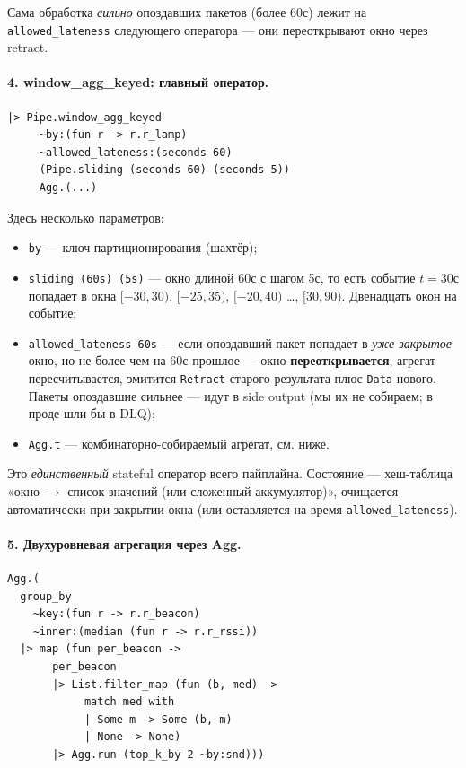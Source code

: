Сама обработка \emph{сильно} опоздавших пакетов (более 60с) лежит на
\texttt{allowed\_lateness} следующего оператора --- они переоткрывают
окно через retract.

\paragraph{4. window\_agg\_keyed: главный оператор.}
\begin{lstlisting}
|> Pipe.window_agg_keyed
     ~by:(fun r -> r.r_lamp)
     ~allowed_lateness:(seconds 60)
     (Pipe.sliding (seconds 60) (seconds 5))
     Agg.(...)
\end{lstlisting}

Здесь несколько параметров:

\begin{itemize}
\item \texttt{by} --- ключ партиционирования (шахтёр);
\item \texttt{sliding (60s) (5s)} --- окно длиной 60с с шагом 5с,
то есть событие $t=30$с попадает в окна $[-30, 30)$, $[-25, 35)$,
$[-20, 40)$ \ldots, $[30, 90)$. Двенадцать окон на событие;
\item \texttt{allowed\_lateness 60s} --- если опоздавший пакет
попадает в \emph{уже закрытое} окно, но не более чем на 60с
прошлое --- окно \textbf{переоткрывается}, агрегат пересчитывается,
эмитится \texttt{Retract} старого результата плюс \texttt{Data}
нового. Пакеты опоздавшие сильнее --- идут в side output (мы их не
собираем; в проде шли бы в DLQ);
\item \texttt{Agg.t} --- комбинаторно-собираемый агрегат, см. ниже.
\end{itemize}

Это \emph{единственный} stateful оператор всего пайплайна. Состояние
--- хеш-таблица «окно $\to$ список значений (или сложенный
аккумулятор)», очищается автоматически при закрытии окна (или
оставляется на время \texttt{allowed\_lateness}).

\paragraph{5. Двухуровневая агрегация через Agg.}
\begin{lstlisting}
Agg.(
  group_by
    ~key:(fun r -> r.r_beacon)
    ~inner:(median (fun r -> r.r_rssi))
  |> map (fun per_beacon ->
       per_beacon
       |> List.filter_map (fun (b, med) ->
            match med with
            | Some m -> Some (b, m)
            | None -> None)
       |> Agg.run (top_k_by 2 ~by:snd)))
\end{lstlisting}


